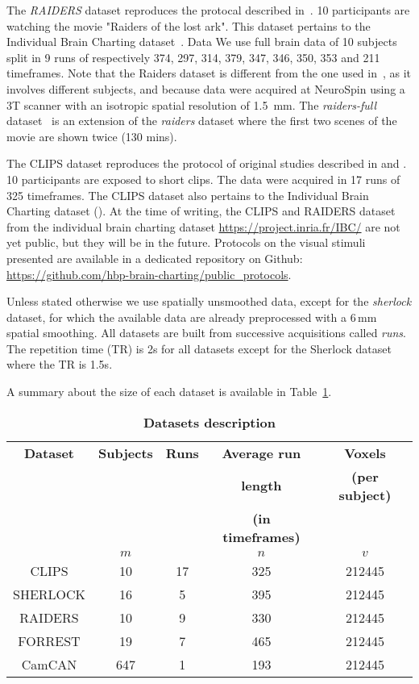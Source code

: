 The \emph{RAIDERS} dataset reproduces the protocal described
in~\cite{haxby2011common}. 10 participants are watching the movie "Raiders
of the lost ark". This dataset pertains to the Individual Brain Charting
dataset~\cite{ibc}.
% 
Data 
% 
We use full brain data of 10 subjects split in 9 runs of respectively 374, 297, 314, 379, 347, 346, 350, 353 and 211 timeframes.
%
Note that the Raiders dataset is different from the one used in~\cite{chen2015reduced}, as it involves different subjects, and because data were acquired at NeuroSpin using a 3T scanner with an isotropic spatial resolution of 1.5 mm.
The \emph{raiders-full} dataset~\cite{ibc} is an extension of the \emph{raiders} dataset where the first two scenes of the movie are shown twice (130 mins).

The CLIPS dataset reproduces the protocol of original studies described in
\cite{nishimoto2011reconstructing} and \cite{huth2012continuous}. 10
participants are exposed to short clips. The data were acquired in 17 runs of 325 timeframes. 
%
The CLIPS dataset also pertains to the Individual Brain Charting dataset
(\cite{ibc}).
%
At the time of writing, the CLIPS and RAIDERS dataset from the individual brain charting dataset \url{https://project.inria.fr/IBC/} are not yet public, but they will be in the future. Protocols on the visual stimuli presented are available in a dedicated repository on Github: \url{https://github.com/hbp-brain-charting/public_protocols}.

Unless stated otherwise we use spatially unsmoothed data, except for the
\emph{sherlock} dataset, for which the available data are already preprocessed
with a 6\,mm spatial smoothing. All datasets are built from successive
acquisitions called \emph{runs}. The repetition time (TR) is 2s for all datasets
except for the Sherlock dataset where the TR is 1.5s.
%

A summary about the size of each dataset is available in Table~\ref{tab:dataset_desc2}.
\begin{table}
	\begin{tabular}{|c|c|c|c|c|}
		\hline
		\textbf{Dataset} & \textbf{Subjects} & \textbf{Runs} & \textbf{Average run} & \textbf{Voxels} \\
                     && & \textbf{length} & \textbf{(per subject)} \\
                     && & \textbf{(in timeframes)} &  \\
                     &$m$& $ $ & $n$ &$v$  \\
		\hline
		CLIPS & 10 & 17 & 325 & 212445\\ 
		\hline
		SHERLOCK & 16 & 5 & 395 & 212445 \\ 
		\hline
		RAIDERS & 10 & 9 & 330 & 212445 \\
		\hline 
		FORREST & 19 & 7 & 465 & 212445\\
		\hline
		CamCAN & 647 & 1 & 193 & 212445 \\
		\hline
	\end{tabular}
  \caption{\textbf{Datasets description}}
  \label{tab:dataset_desc2}
\end{table}
